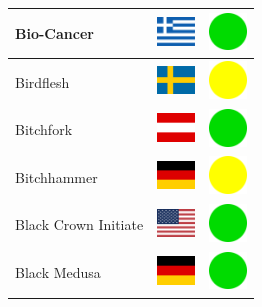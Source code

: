 \documentclass[12pt, a4paper, twoside]{report}
\begin{document}
\begin{center}
\begin{longtable}{|p{5cm}|p{2cm}|p{2cm}|}
 Bio-Cancer                                                 & \includegraphics[width=1cm]{../4x3/gr} &   \includegraphics[width=1cm]{../likes/y} \\ \hline
 Birdflesh                                                  & \includegraphics[width=1cm]{../4x3/se} &   \includegraphics[width=1cm]{../likes/m} \\ \hline
 Bitchfork                                                  & \includegraphics[width=1cm]{../4x3/at} &   \includegraphics[width=1cm]{../likes/y} \\ \hline
 Bitchhammer                                                & \includegraphics[width=1cm]{../4x3/de} &   \includegraphics[width=1cm]{../likes/m} \\ \hline
 Black Crown Initiate                                       & \includegraphics[width=1cm]{../4x3/us} &   \includegraphics[width=1cm]{../likes/y} \\ \hline
 Black Medusa                                               & \includegraphics[width=1cm]{../4x3/de} &   \includegraphics[width=1cm]{../likes/y} \\ \hline

\end{longtable}
\end{center}
\end{document}
